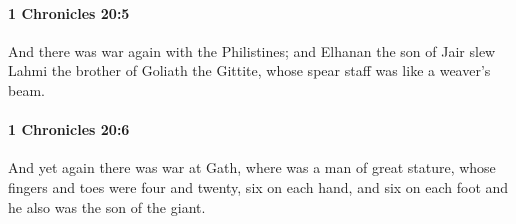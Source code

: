 		\paragraph{1 Chronicles 20:5} %
			\label{1CHRONICLES-20-5}

			And there was war again with the Philistines; and Elhanan the son of Jair slew Lahmi the brother of Goliath the Gittite, whose spear staff was like a weaver’s beam.


		\paragraph{1 Chronicles 20:6} %
			\label{1CHRONICLES-20-6}

			And yet again there was war at Gath, where was a man of great stature, whose fingers and toes were four and twenty, six on each hand, and six on each foot and he also was the son of the giant.


